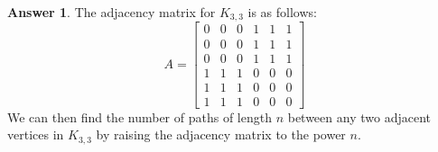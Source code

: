 \documentclass[article, 12pt]{article}
\theoremstyle{definition}
\newtheorem{answer}{Answer}
\begin{document}
    \begin{answer}
        The adjacency matrix for $K_{3,3}$ is as follows:
        \begin{equation*}
            A = \begin{bmatrix}
                0 & 0 & 0 & 1 & 1 & 1 \\
                0 & 0 & 0 & 1 & 1 & 1 \\
                0 & 0 & 0 & 1 & 1 & 1 \\
                1 & 1 & 1 & 0 & 0 & 0 \\
                1 & 1 & 1 & 0 & 0 & 0 \\
                1 & 1 & 1 & 0 & 0 & 0
            \end{bmatrix}
        \end{equation*}
        We can then find the number of paths of length $n$ between any two adjacent vertices in $K_{3,3}$ by raising the adjacency matrix to the power $n$.
        

\end{answer}
\end{document}
